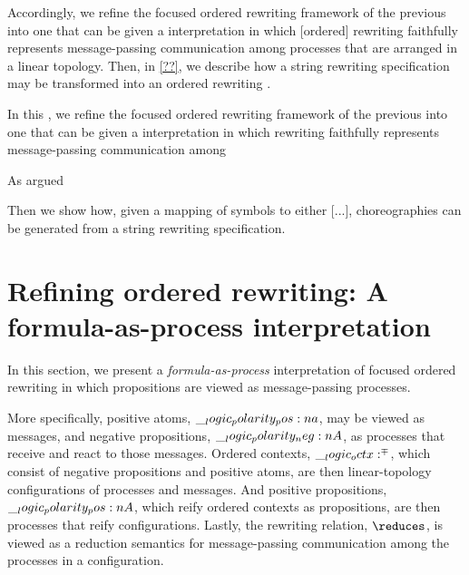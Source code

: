 Accordingly, we refine the focused ordered rewriting framework of the previous  into one that can be given a  interpretation in which [ordered] rewriting faithfully represents message-passing communication among processes that are arranged in a linear topology.
Then, in \cref{??}, we describe how a string rewriting specification may be transformed into an ordered rewriting .

In this , we refine the focused ordered rewriting framework of the previous  into one that can be given a  interpretation in which rewriting faithfully represents message-passing communication among 

As argued 

Then we show how, given a mapping of symbols to either [...], choreographies can be generated from a string rewriting specification.



\section{Refining ordered rewriting: A formula-as-process interpretation}

In this section, we present a \emph{formula-as-process} interpretation of focused ordered rewriting in which propositions are viewed as message-passing processes.

More specifically,
positive atoms, $\__logic_polarity_pos:n {a}$, may be viewed as messages, and negative propositions, $\__logic_polarity_neg:n {A}$, as processes that receive and react to those messages.
Ordered contexts, $\__logic_octx:^{\mp}$, which consist of negative propositions and positive atoms, are then linear-topology configurations of processes and messages.
And positive propositions, $\__logic_polarity_pos:n {A}$, which reify ordered contexts as propositions, are then processes that reify configurations.
Lastly, the rewriting relation, $\reduces$, is viewed as a reduction semantics for message-passing communication among the processes in a configuration.


